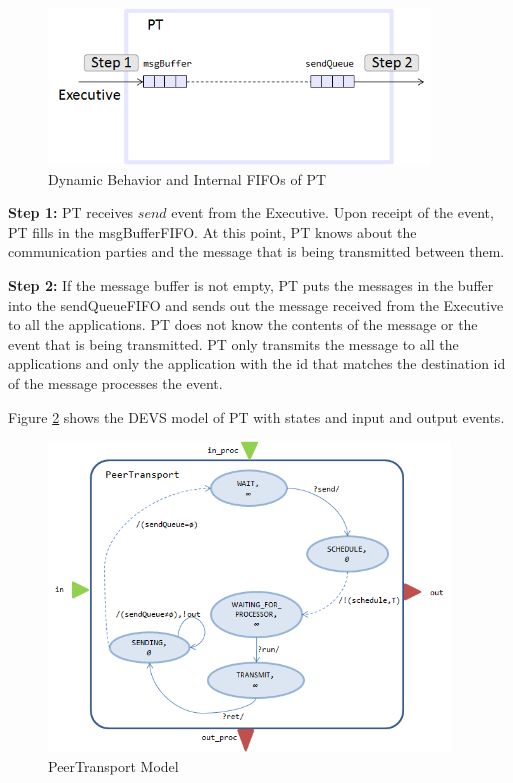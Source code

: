 \begin{figure}
 \centering
 \includegraphics[width=0.90\textwidth]{figures/pt_behavior.png}
 \caption{Dynamic Behavior and Internal FIFOs of PT}
 \label{fig:pt_behavior}
\end{figure}

\textbf{Step 1:} PT receives $send$ event from the Executive. Upon receipt of the event, PT fills in the msgBufferFIFO. At this point, PT knows about the communication parties and the message that is being transmitted between them. 

\textbf{Step 2:} If the message buffer is not empty, PT puts the messages in the buffer into the sendQueueFIFO and sends out the message received from the Executive to all the applications. PT does not know the contents of the message or the event that is being transmitted. PT only transmits the message to all the applications and only the application with the id that matches the destination id of the message processes the event.

Figure \ref{fig:ptmodel1} shows the DEVS model of PT with states and input and output events.

\begin{figure}
	\centering
		\includegraphics[width=0.95\textwidth]{figures/ptmodel1.png}
	\caption{PeerTransport Model}
	\label{fig:ptmodel1}
\end{figure}

